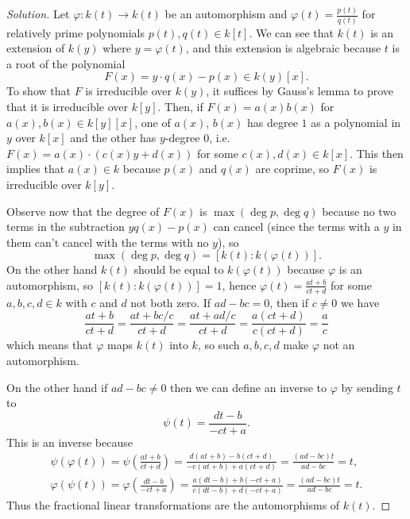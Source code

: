 \documentclass[10pt]{article}
\newenvironment{soln}{\begin{proof}[Solution]}{\end{proof}}
\begin{document}
\begin{soln}
    Let $\varphi\colon k(t)\to k(t)$ be an automorphism
    and $\varphi(t) = \frac{p(t)}{q(t)}$ for relatively prime polynomials
    $p(t),q(t)\in k[t]$.
    We can see that $k(t)$ is an extension of $k(y)$ where $y = \varphi(t)$,
    and this extension is algebraic because $t$ is a root of the polynomial
    \begin{equation*}
	F(x) = y\cdot q(x) - p(x)\in k(y)[x].
    \end{equation*}
    To show that $F$ is irreducible over $k(y)$,
    it suffices by Gauss's lemma to prove that it is irreducible over $k[y]$.
    Then, if $F(x) = a(x)b(x)$ for $a(x),b(x)\in k[y][x]$,
    one of $a(x)$, $b(x)$ has degree $1$ as a polynomial in $y$ over $k[x]$
    and the other has $y$-degree $0$, i.e.
    $F(x) = a(x)\cdot (c(x)y + d(x))$ for some $c(x),d(x)\in k[x]$.
    This then implies that $a(x)\in k$ because $p(x)$ and $q(x)$ are coprime,
    so $F(x)$ is irreducible over $k[y]$.

    Observe now that the degree of $F(x)$ is $\max(\deg p,\deg q)$
    because no two terms in the subtraction $yq(x) - p(x)$ can cancel
    (since the terms with a $y$ in them can't cancel with
    the terms with no $y$), so
    \begin{equation*}
	\max(\deg p,\deg q) = [k(t) : k(\varphi(t))].
    \end{equation*}
    On the other hand $k(t)$ should be equal to $k(\varphi(t))$
    because $\varphi$ is an automorphism,
    so $[k(t) : k(\varphi(t))] = 1$, hence
    $\varphi(t) = \frac{at + b}{ct + d}$ for some $a,b,c,d\in k$
    with $c$ and $d$ not both zero.
    If $ad - bc = 0$, then if $c\ne 0$ we have
    \begin{equation*}
	\frac{at + b}{ct + d} = \frac{at + bc/c}{ct + d}
	= \frac{at + ad/c}{ct+d}
	= \frac{a(ct + d)}{c(ct + d)} = \frac ac
    \end{equation*}
    which means that $\varphi$ maps $k(t)$ into $k$,
    so such $a,b,c,d$ make $\varphi$ not an automorphism.

    On the other hand if $ad - bc \ne 0$ then
    we can define an inverse to $\varphi$ by sending $t$ to
    \begin{equation*}
	\psi(t) = \frac{dt - b}{-ct + a}.
    \end{equation*}
    This is an inverse because
    \begin{gather*}
	\psi(\varphi(t)) = \psi\left(\frac{at + b}{ct + d}\right)
	= \frac{d(at + b) - b(ct + d)}
	{-c(at + b) + a(ct + d)}
	= \frac{(ad-bc)t}{ad-bc} = t,\\
	\varphi(\psi(t)) = \varphi\left(\frac{dt - b}{-ct + a}\right)
	= \frac{a(dt - b) + b(-ct + a)}
	{c(dt - b) + d(-ct + a)}
	= \frac{(ad-bc)t}{ad-bc} = t.
    \end{gather*}
    Thus the fractional linear transformations
    are the automorphisms of $k(t)$.
\end{soln}
\end{document}
